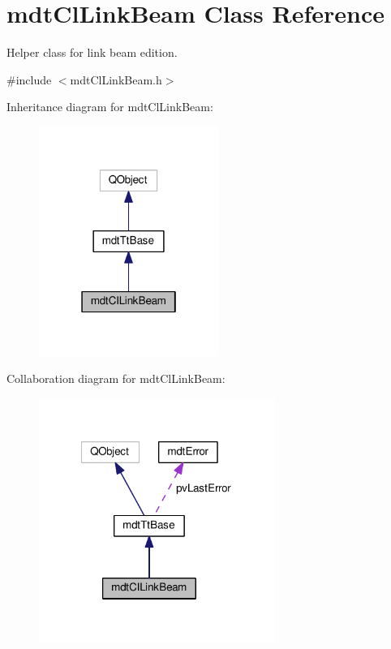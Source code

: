 \hypertarget{classmdt_cl_link_beam}{\section{mdt\-Cl\-Link\-Beam Class Reference}
\label{classmdt_cl_link_beam}
}


Helper class for link beam edition.  




{\ttfamily \#include $<$mdt\-Cl\-Link\-Beam.\-h$>$}



Inheritance diagram for mdt\-Cl\-Link\-Beam\-:
\nopagebreak
\begin{figure}[H]
\begin{center}
\leavevmode
\includegraphics[width=166pt]{classmdt_cl_link_beam__inherit__graph}
\end{center}
\end{figure}


Collaboration diagram for mdt\-Cl\-Link\-Beam\-:
\nopagebreak
\begin{figure}[H]
\begin{center}
\leavevmode
\includegraphics[width=218pt]{classmdt_cl_link_beam__coll__graph}
\end{center}
\end{figure}

